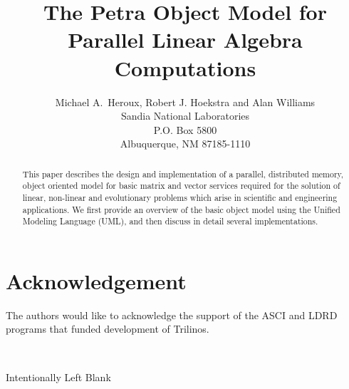 \documentclass[10pt,relax]{PetraObjectModel}
\title{The Petra Object Model for Parallel Linear Algebra Computations}
\author{Michael A.~Heroux, Robert J. Hoekstra and Alan Williams \\
       Sandia National Laboratories\\
       P.O. Box 5800\\
       Albuquerque, NM 87185-1110
     }
\date{}
\begin{document}
\maketitle

\begin{abstract}
This paper describes the design and implementation of a parallel,
distributed memory, object oriented model for basic
matrix and vector services required for the solution of linear,
non-linear and evolutionary problems which arise in scientific
and engineering applications.  We first provide an overview of
the basic object model using the Unified Modeling Language (UML),
and then discuss in detail several implementations.
\end{abstract}


\clearpage
\section*{Acknowledgement}
The authors would like to acknowledge the support of the ASCI and LDRD programs
that funded development of Trilinos.

\newpage
\
\vspace{3.5in}
\begin{center}Intentionally Left Blank\end{center}
\clearpage
\tableofcontents
\listoffigures

\clearpage
{}
\end{document}
